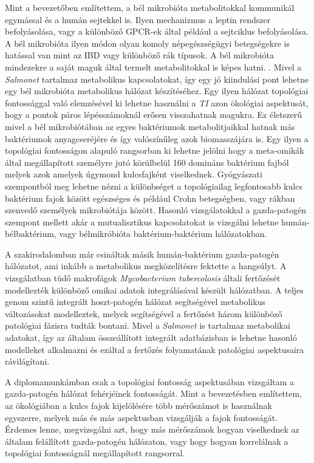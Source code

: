 \documentclass[a4paper,12pt]{article}
\begin{document}
		Mint a bevezetőben említettem, a bél mikrobióta metabolitokkal kommunikál egymással és a humán sejtekkel is. Ilyen mechanizmus a leptin rendszer befolyásolása, vagy a különböző GPCR-ek által például a sejtciklus befolyásolása. \cite{buthyrate_immune} A bél mikrobióta ilyen módon olyan komoly népegészségügyi betegségekre is hatással van mint az IBD vagy különböző rák típusok. \cite{gut_microbiome} A bél mikrobióta mindezekre a saját maguk által termelt metabolitokkal is képes hatni. \cite{scfa_and_vitamine}. Mivel a \textit{Salmonet} tartalmaz metabolikus kapcsolatokat, így egy jó kiindulási pont lehetne egy bél mikrobióta metabolikus hálózat készítéséhez. Egy ilyen hálózat topológiai fontossággal való elemzésével ki lehetne használni a \textit{TI} azon ökológiai aspektusát, hogy a pontok páros lépésszámoknál erősen visszahatnak magukra. Ez életszerű mivel a bél mikrobiótában az egyes baktériumok metabolitjaikkal hatnak más baktériumok anyagcseréjére és így valószínűleg azok biomasszájára is. \cite{gut_microbiome} Egy ilyen a topológiai fontosságon alapuló rangsorban ki lehetne jelölni hogy a meta-omikák által megállapított személyre jutó körülbelül 160 domináns baktérium fajból \cite{meta_omics} melyek azok amelyek úgymond kulcsfajként viselkednek. Gyógyászati szempontból meg lehetne nézni a különbséget a topológiailag legfontosabb kulcs baktérium fajok között egészséges és például Crohn betegségben, vagy rákban szenvedő személyek mikrobiótája között. Hasonló vizsgálatokkal a gazda-patogén szempont mellett akár a mutualisztikus kapcsolatokat is vizsgálni lehetne humán-bélbaktérium, vagy bélmikróbióta baktérium-baktérium hálózatokban.
 
 		A szakirodalomban már csináltak másik humán-baktérium gazda-patogén hálózatot, ami inkább a metabolikus megközelítésre fektette a hangsúlyt. A vizsgálatban tüdő makrofágok \textit{Mycobacterium tubercolosis} általi fertőzését modellezték különböző omikai adatok integrálásával készült hálózatban. A teljes genom szintű integrált hoszt-patogén hálózat segítségével metabolikus változásokat modelleztek, melyek segítségével a fertőzést három különböző patológiai fázisra tudták bontani. \cite{discussion_alveolar_macrophage} Mivel a \textit{Salmonet} is tartalmaz metabolikai adatokat, így az általam összeállított integrált adatbázisban is lehetne hasonló modelleket alkalmazni és ezáltal a fertőzés folyamatának patológiai aspektusaira rávilágítani.
		
		A diplomamunkámban csak a topológiai fontosság aspektusában vizsgáltam a gazda-patogén hálózat fehérjéinek fontosságát. Mint a bevezetésben említettem, az ökológiában a kulcs fajok kijelölésére több mérőszámot is használnak egyszerre, melyek más és más aspektusban vizsgálják a fajok fontosságát.\cite{jordan_comparison} \cite{ti} Érdemes lenne, megvizsgálni azt, hogy más mérőszámok hogyan viselkednek az általam felállított gazda-patogén hálózaton, vagy hogy hogyan korrelálnak a topológiai fontosságnál megállapított rangsorral.
\end{document}
